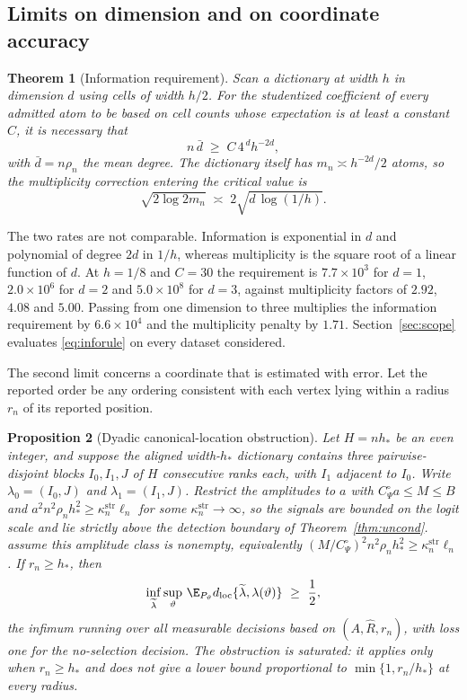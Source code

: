 \documentclass[11pt]{article}
\newtheorem{theorem}{Theorem}[section]
\newtheorem{proposition}[theorem]{Proposition}
\theoremstyle{definition}
\newcommand{\1}{\mathbf 1}\newcommand{\op}{\operatorname}
\begin{document}
\subsection{Limits on dimension and on coordinate accuracy} \label{sec:thy-limits}

\begin{theorem}[Information requirement]                      \label{thm:info}
Scan a dictionary at width $h$ in dimension $d$ using cells of width $h/2$.
For the studentized coefficient of every admitted atom to be based on cell
counts whose expectation is at least a constant $C$, it is necessary that
\begin{equation}
n\,\bar d\;\ge\;C\,4^{\,d}h^{-2d},
\label{eq:inforule}
\end{equation}
with $\bar d=n\rho_n$ the mean degree.  The dictionary itself has
$m_n\asymp h^{-2d}/2$ atoms, so the multiplicity correction entering the
critical value is
\begin{equation}
\sqrt{2\log 2m_n}\;\asymp\;2\sqrt{d\,\log(1/h)} .
\label{eq:multrule}
\end{equation}
\end{theorem}

The two rates are not comparable.  Information is exponential in $d$ and
polynomial of degree $2d$ in $1/h$, whereas multiplicity is the square root of
a linear function of $d$.  At $h=1/8$ and $C=30$ the requirement is
$7.7\times10^{3}$ for $d=1$, $2.0\times10^{6}$ for $d=2$ and
$5.0\times10^{8}$ for $d=3$, against multiplicity factors of $2.92$, $4.08$ and
$5.00$.  Passing from one dimension to three multiplies the information
requirement by $6.6\times10^{4}$ and the multiplicity penalty by $1.71$.
Section~\ref{sec:scope} evaluates \eqref{eq:inforule} on every dataset
considered.

The second limit concerns a coordinate that is estimated with error.  Let the
reported order be any ordering consistent with each vertex lying within a
radius $r_n$ of its reported position.

\begin{proposition}[Dyadic canonical-location obstruction]
\label{prop:obstruct}
Let $H=nh_*$ be an even integer, and suppose the aligned width-$h_*$ dictionary
contains three pairwise-disjoint blocks $I_0,I_1,J$ of $H$ consecutive ranks each,
with $I_1$ adjacent to $I_0$.  Write $\lambda_0=(I_0,J)$ and $\lambda_1=(I_1,J)$.
Restrict the amplitudes to $a$ with $C_\Psi^\circ a\le M\le B$ and
$a^2n^2\rho_nh_*^2\ge\kappa_n^{\mathrm{str}}\ell_n$ for some
$\kappa_n^{\mathrm{str}}\to\infty$, so the signals are bounded on the logit scale
and lie strictly above the detection boundary of Theorem~\ref{thm:uncond}.
assume this amplitude class is nonempty, equivalently
$(M/C_\Psi^\circ)^2n^2\rho_nh_*^2\ge\kappa_n^{\mathrm{str}}\ell_n$.  If
$r_n\ge h_*$, then
\[
 \inf_{\widetilde\lambda}
 \sup_{\vartheta}\,\E_{P_\vartheta}
 d_{\rm loc}\{\widetilde\lambda,\lambda(\vartheta)\}\ \ge\ \frac12,
\]
the infimum running over all measurable decisions based on
$(A,\widehat R,r_n)$, with loss one for the no-selection decision.  The
obstruction is saturated: it applies only when $r_n\ge h_*$ and does not give a
lower bound proportional to $\min\{1,r_n/h_*\}$ at every radius.
\end{proposition}
\end{document}
